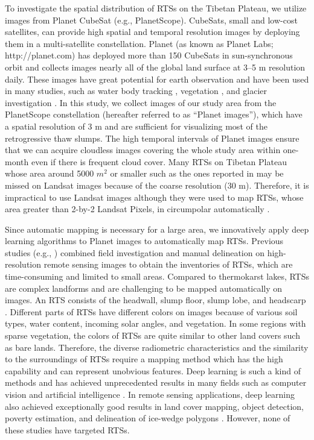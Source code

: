 \documentclass[preprint,12pt,authoryear]{elsarticle}
\begin{document}
To investigate the spatial distribution of RTSs on the Tibetan Plateau, we utilize images from Planet CubeSat (e.g., PlanetScope). CubeSats, small and low-cost satellites, can provide high spatial and temporal resolution images by deploying them in a multi-satellite constellation. Planet (as known as Planet Labs; http://planet.com) has deployed more than 150 CubeSats in sun-synchronous orbit and collects images nearly all of the global land surface at 3--5 m resolution daily. These images have great potential for earth observation and have been used in many studies, such as water body tracking \citep{cooley2017tracking, cooley2019arctic, aragon2018cubesats, miles2018glacial}, vegetation \citep{houborg2016high, houborg2018daily}, and glacier investigation \citep{altena2017glacier}. In this study, we collect images of our study area from the PlanetScope constellation (hereafter referred to as “Planet images”), which have a spatial resolution of 3 m and are sufficient for visualizing most of the retrogressive thaw slumps. The high temporal intervals of Planet images ensure that we can acquire cloudless images covering the whole study area within one-month even if there is frequent cloud cover. Many RTSs on Tibetan Plateau whose area around 5000 $m^2$ or smaller such as the ones reported in \citep{niu2012development,niu2016thaw} may be missed on Landsat images because of the coarse resolution (30 m). Therefore, it is impractical to use Landsat images although they were used to map RTSs, whose area greater than 2-by-2 Landsat Pixels, in circumpolar automatically \citep{lacelle_distribution_2015, brooker2014mapping, nitze2018remote}. 

Since automatic mapping is necessary for a large area, we innovatively apply deep learning algorithms to Planet images to automatically map RTSs. Previous studies (e.g., \citealp{ramage_terrain_2017, lantuit_fifty_2008, niu2014thaw}) combined field investigation and manual delineation on high-resolution remote sensing images to obtain the inventories of RTSs, which are time-consuming and limited to small areas. Compared to thermokarst lakes, RTSs are complex landforms and are challenging to be mapped automatically on images. An RTS consists of the headwall, slump floor, slump lobe, and headscarp \citep{lantuit_fifty_2008}. Different parts of RTSs have different colors on images because of various soil types, water content, incoming solar angles, and vegetation. In some regions with sparse vegetation, the colors of RTSs are quite similar to other land covers such as bare lands. Therefore, the diverse radiometric characteristics and the similarity to the surroundings of RTSs require a mapping method which has the high capability and can represent unobvious features. Deep learning is such a kind of methods and has achieved unprecedented results in many fields such as computer vision and artificial intelligence \citep{krizhevsky_imagenet_2012, lecun_deep_2015, silver_mastering_2017}. In remote sensing applications, deep learning also achieved exceptionally good results in land cover mapping, object detection, poverty estimation, and delineation of ice-wedge polygons \citep{jean_combining_2016, guo_geospatial_2018, zhang2018deep}. However, none of these studies have targeted RTSs. 
\end{document}
